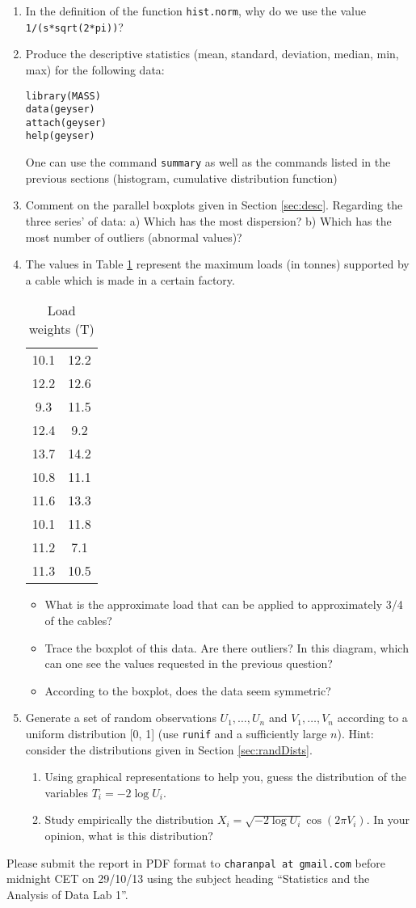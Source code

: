 \documentclass[a4paper,10pt]{article}
\begin{document}
\begin{enumerate} 
\item In the definition of the function \texttt{hist.norm}, why do we use the value \texttt{1/(s*sqrt(2*pi))}?
\item Produce the descriptive statistics (mean, standard, deviation, median, min, max) for the following data: 
\begin{lstlisting} 
library(MASS)
data(geyser)
attach(geyser)
help(geyser)
\end{lstlisting}
One can use the command \texttt{summary} as well as the commands listed in the previous sections (histogram, cumulative distribution function) 
\item Comment on the parallel boxplots given in Section  \ref{sec:desc}. Regarding the three series' of data: a) Which has the most dispersion? b) Which has the most number of outliers (abnormal values)? 
\item The values in Table \ref{tab:loads} represent the maximum loads (in tonnes) supported by a cable which is made in a certain factory. 
\begin{table}
\begin{center}
\begin{tabular}{c c} 
\hline
10.1 & 12.2\\
12.2 & 12.6\\
9.3 & 11.5\\
12.4 & 9.2\\
13.7 & 14.2\\
10.8 & 11.1\\
11.6 & 13.3\\
10.1 & 11.8 \\
11.2 & 7.1\\
11.3 & 10.5\\
\hline
\end{tabular}
\end{center}
\caption{Load weights (T)}\label{tab:loads}
\end{table}
\begin{itemize}
\item What is the approximate load that can be applied to approximately 3/4 of the cables? 
\item Trace the boxplot of this data. Are there outliers? In this diagram, which can one see the values requested in the previous question? 
\item According to the boxplot, does the data seem symmetric? 
\end{itemize}
\item Generate a set of random observations $U_1 , \ldots , U_n$ and $V_1 ,\ldots , V_n$ according to a uniform distribution [0, 1] (use \texttt{runif} and a sufficiently large $n$). Hint: consider the distributions given in Section \ref{sec:randDists}. 
\begin{enumerate}
\item Using graphical representations to help you, guess the distribution of the variables $T_i = -2 \log U_i$. 
\item Study empirically the distribution $X_i = \sqrt{-2 \log U_i} \cos(2 \pi V_i ).$ In your opinion, what is this distribution? 
\end{enumerate}
\end{enumerate}

Please submit the report in PDF format to \texttt{charanpal at gmail.com} before midnight CET on 29/10/13 using the subject heading ``Statistics and the Analysis of Data Lab 1''. 
\end{document}
